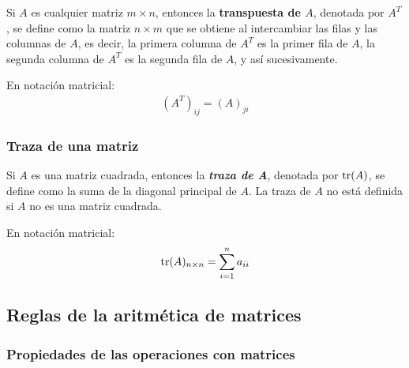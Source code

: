 \documentclass[a4paper,12pt]{article}
\begin{document}
\begin{concept}[i]
  Si $A$ es cualquier matriz $m\times n$, entonces la \textbf{transpuesta de
    $A$}, denotada por $A^T$, se define como la matriz $n\times m$ que se
    obtiene al intercambiar las filas y las columnas de $A$, es decir, la
    primera columna de $A^T$ es la primer fila de $A$, la segunda columna de
    $A^T$ es la segunda fila de $A$, y así sucesivamente.
\end{concept}
En notación matricial:
\begin{align*}
  \left( A^T \right)_{ij} = (A)_{ji}
\end{align*}

\subsubsection{Traza de una matriz}

\begin{concept}[i]
  Si $A$ es una matriz cuadrada, entonces la \textbf{\emph{traza de A}},
  denotada por $\operatorname{tr} (A)$, se define como la suma de la diagonal principal de
  $A$. La traza de $A$ no está definida si $A$ no es una matriz cuadrada.
\end{concept}
En notación matricial:
\begin{align*}
  \operatorname{tr} (A)_{n\times n}=\sum_{i=1}^n a_{ii}
\end{align*}

\subsection{Reglas de la aritmética de matrices}

\subsubsection{Propiedades de las operaciones con matrices}
\end{document}
